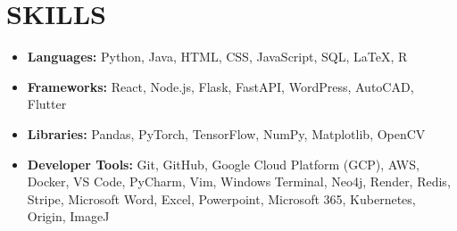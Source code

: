 \documentclass[10pt, letterpaper]{article}
\newenvironment{highlights}{
    \begin{itemize}[
        topsep=0.03 cm,
        parsep=0.03 cm,
        partopsep=0pt,
        itemsep=0pt,
        leftmargin=0.4 cm + 10pt
    ]
}{
    \end{itemize}
} %
\begin{document}
\section{SKILLS}
    \begin{highlights}
        \item \textbf{Languages:} Python, Java, HTML, CSS, JavaScript, SQL, LaTeX, R
        \item \textbf{Frameworks:} React, Node.js, Flask, FastAPI, WordPress, AutoCAD, Flutter
        \item \textbf{Libraries:} Pandas, PyTorch, TensorFlow, NumPy, Matplotlib, OpenCV
        \item \textbf{Developer Tools:} Git, GitHub, Google Cloud Platform (GCP), AWS, Docker, VS Code, PyCharm, Vim, Windows Terminal, Neo4j, Render, Redis, Stripe, Microsoft Word, Excel, Powerpoint, Microsoft 365, Kubernetes, Origin, ImageJ
    \end{highlights}
\end{document}
